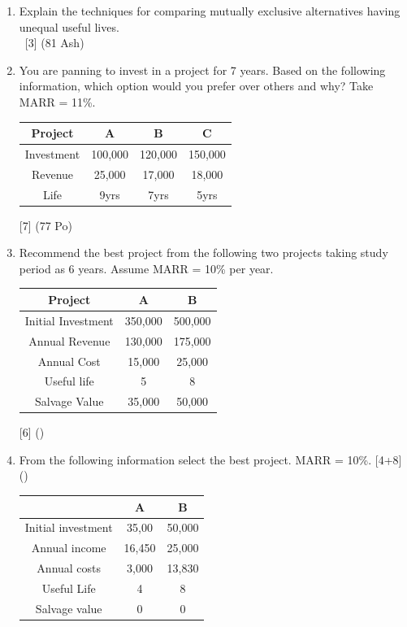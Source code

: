 \documentclass[12pt]{article}
\newcommand{\enter}{\\\textcolor{white}{1}}
\begin{document}
		\begin{enumerate}
			\item Explain the techniques for comparing mutually exclusive alternatives having unequal useful lives. 
			\enter\hfill [3] (81 Ash)
			
			\item You are panning to invest in a project for 7 years. Based on the following information, which option would you prefer over others and why? Take MARR = 11\%. \\
			\begin{tabular}{|c|c|c|c|}
				\hline
				Project & A & B & C \\ \hline
				Investment & 100,000 & 120,000 & 150,000 \\ \hline
				Revenue & 25,000 & 17,000 & 18,000 \\ \hline
				Life & 9yrs & 7yrs & 5yrs \\ \hline
			\end{tabular}\hfill [7] (77 Po)
			
			\item Recommend the best project from the following two projects taking study period as 6 years. Assume MARR = 10\% per year.\\
			\begin{tabular}{|c|c|c|}
				\hline
				Project & A & B \\ \hline
				Initial Investment & 350,000 & 500,000 \\ \hline
				Annual Revenue & 130,000 & 175,000 \\ \hline
				Annual Cost & 15,000 & 25,000 \\ \hline
				Useful life & 5 & 8 \\ \hline
				Salvage Value & 35,000 & 50,000 \\ \hline
			\end{tabular}\hfill [6] ()
			
			\item From the following information select the best project. MARR = 10\%. \hfill [4+8] ()
			\begin{tabular}{|c|c|c|}
				\hline
				& A & B \\ \hline
				Initial investment & 35,00 & 50,000 \\ \hline
				Annual income & 16,450 & 25,000 \\ \hline
				Annual costs & 3,000 & 13,830 \\ \hline
				Useful Life & 4 & 8 \\ \hline
				Salvage value & 0 & 0 \\ \hline
			\end{tabular}
			

\end{enumerate}
\end{document}
